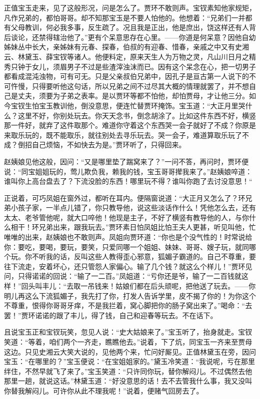 \documentclass[12pt,oneside]{book}
\begin{document}
正值宝玉走来，见了这般形况，问是怎么了。贾环不敢则声。宝钗素知他家规矩，凡作兄弟的，都怕哥哥。却不知那宝玉是不要人怕他的。他想着：“兄弟们一并都有父母教训，何必我多事，反生疏了。况且我是正出，他是庶出，饶这样还有人背后谈论，还禁得辖治他了。”更有个呆意思存在心里。——你道是何呆意？因他自幼姊妹丛中长大，亲姊妹有元春、探春，伯叔的有迎春、惜春，亲戚之中又有史湘云、林黛玉、薛宝钗等诸人。他便料定，原来天生人为万物之灵，凡山川日月之精秀只钟于女儿，须眉男子不过是些渣滓浊沫而已。因有这个呆念在心，把一切男子都看成混沌浊物，可有可无。只是父亲叔伯兄弟中，因孔子是亘古第一人说下的不可忤慢，只得要听他这句话，所以兄弟之间不过尽其大概的情理就罢了，并不想自己是丈夫，须要为子弟之表率。是以贾环等都不怕他，却怕贾母，才让他三分。如今宝钗生怕宝玉教训他，倒没意思，便连忙替贾环掩饰。宝玉道：“大正月里哭什么？这里不好，你别处玩去。你天天念书，倒念胡涂了。比如这件东西不好，横竖那一件好，就弃了这件取那个。难道你守着这个东西哭一会子就好了不成？你原是来取乐玩的，既不能取乐，就往别处去寻乐玩去。哭一会子，难道算取乐玩了不成？倒招自己烦恼，不如快去为是。”贾环听了，只得回来。

赵姨娘见他这般，因问：“又是哪里垫了踹窝来了？”一问不答，再问时，贾环便说：“同宝姐姐玩的，莺儿欺负我，赖我的钱，宝玉哥哥撵我来了。”赵姨娘啐道：谁叫你上高台盘去了？下流没脸的东西！哪里玩不得？谁叫你跑了去讨没意思！“

正说着，可巧凤姐在窗外过，都听在耳内。便隔窗说道：“大正月又怎么了？环兄弟小孩子家，一半点儿错了，你只教导他，说这些淡话作什么！凭他怎么去，还有太太、老爷管他呢，就大口啐他！他现是主子，不好了横竖有教导他的人，与你什么相干！环兄弟出来，跟我玩去。”贾环素日怕凤姐比怕王夫人更甚，听见叫他，忙唯唯的出来，赵姨娘也不敢则声。凤姐向贾环道：“你也是个没气性的！时常说给你：要吃，要喝，要玩，要笑，只爱同哪一个姐姐、妹妹、哥哥、嫂子玩，就同哪个玩。你不听我的话，反叫这些人教得歪心邪意，狐媚子霸道的。自己不尊重，要往下流走，安着坏心，还只管怨人家偏心。输了几个钱？就这么个样儿！”贾环见问，只得诺诺的回说：“输了一二百。”凤姐道：“亏你还是爷，输了一二百钱就这样！”回头叫丰儿：“去取一吊钱来！姑娘们都在后头顽呢，把他送了玩去。——你明儿再这么下流狐媚子，我先打了你，打发人告诉学里，皮不揭了你的！为你这个不尊重，恨得你哥哥牙痒，不是我拦着，窝心脚把你的肠子窝出来了。”喝命：“去罢！”贾环诺诺的跟了丰儿，得了钱，自己和迎春等玩去。不在话下。

且说宝玉正和宝钗玩笑，忽见人说：“史大姑娘来了。”宝玉听了，抬身就走。宝钗笑道：“等着，咱们两个一齐走，瞧瞧他去。”说着，下了炕，同宝玉一齐来至贾母这边。只见史湘云大笑大说的，见他两个来，忙问好厮见。正值林黛玉在旁，因问宝玉：“在哪里的？”宝玉便说：“在宝姐姐家的。”黛玉冷笑道：“我说呢，亏在那里绊住，不然早就飞了来了。”宝玉笑道：“只许同你玩，替你解闷儿。不过偶然去他那里一趟，就说这话。”林黛玉道：“好没意思的话！去不去管我什么事，我又没叫你替我解闷儿。可许你从此不理我呢！”说着，便赌气回房去了。
\end{document}
